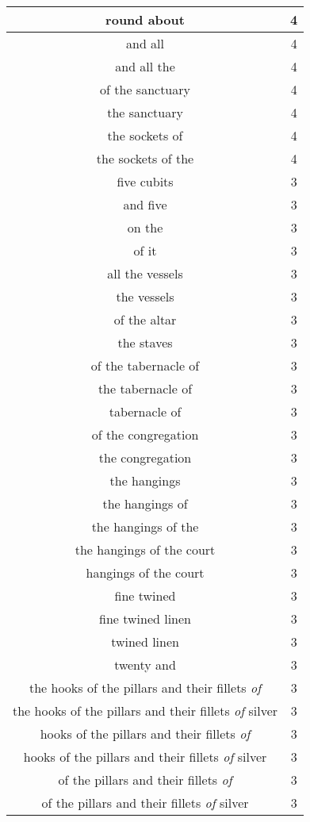 \begin{center}
\begin{longtable}{|c|c|}
round about & 4\\ \hline 
and all & 4\\ \hline 
and all the & 4\\ \hline 
of the sanctuary & 4\\ \hline 
the sanctuary & 4\\ \hline 
the sockets of & 4\\ \hline 
the sockets of the & 4\\ \hline 
five cubits & 3\\ \hline 
and five & 3\\ \hline 
on the & 3\\ \hline 
of it & 3\\ \hline 
all the vessels & 3\\ \hline 
the vessels & 3\\ \hline 
of the altar & 3\\ \hline 
the staves & 3\\ \hline 
of the tabernacle of & 3\\ \hline 
the tabernacle of & 3\\ \hline 
tabernacle of & 3\\ \hline 
of the congregation & 3\\ \hline 
the congregation & 3\\ \hline 
the hangings & 3\\ \hline 
the hangings of & 3\\ \hline 
the hangings of the & 3\\ \hline 
the hangings of the court & 3\\ \hline 
hangings of the court & 3\\ \hline 
fine twined & 3\\ \hline 
fine twined linen & 3\\ \hline 
twined linen & 3\\ \hline 
twenty and & 3\\ \hline 
the hooks of the pillars and their fillets \emph{of} & 3\\ \hline 
the hooks of the pillars and their fillets \emph{of} silver & 3\\ \hline 
hooks of the pillars and their fillets \emph{of} & 3\\ \hline 
hooks of the pillars and their fillets \emph{of} silver & 3\\ \hline 
of the pillars and their fillets \emph{of} & 3\\ \hline 
of the pillars and their fillets \emph{of} silver & 3\\ \hline 

\end{longtable}
\end{center}
